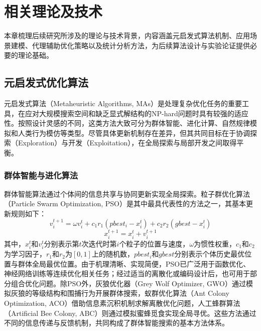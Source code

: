 \chapter{相关理论及技术}

本章梳理后续研究所涉及的理论与技术背景，内容涵盖元启发式算法机制、应用场景建模、代理辅助优化策略以及统计分析方法，为后续算法设计与实验论证提供必要的理论基础。

\section{元启发式优化算法}

元启发式算法（Metaheuristic Algorithms, MAs）是处理复杂优化任务的重要工具，在应对大规模搜索空间和缺乏显式解结构的NP-hard问题时具有较强的适应性\cite{ibsa_ref4,sbo_ref1}。按照设计灵感的不同，这类方法大致可分为群体智能、进化计算、自然规律模拟和人类行为模仿等类型\cite{sbo_ref11}。尽管具体更新机制存在差异，但其共同目标在于协调探索（Exploration）与开发（Exploitation），在全局探索与局部开发之间取得平衡\cite{ibsa_ref75}。

\subsection{群体智能与进化算法}

群体智能算法通过个体间的信息共享与协同更新实现全局探索\cite{sbo_ref18}。粒子群优化算法（Particle Swarm Optimization, PSO）\cite{ibsa_ref26}是其中最具代表性的方法之一，其基本更新规则如下：
\begin{equation}
v_i^{t+1} = \omega v_i^t + c_1 r_1 (pbest_i - x_i^t) + c_2 r_2 (gbest - x_i^t)
\end{equation}
\begin{equation}
x_i^{t+1} = x_i^t + v_i^{t+1}
\end{equation}
其中，$x_i^t$和$v_i^t$分别表示第$t$次迭代时第$i$个粒子的位置与速度，$\omega$为惯性权重，$c_1$和$c_2$为学习因子，$r_1$和$r_2$为$[0,1]$上的随机数，$pbest_i$和$gbest$分别表示个体历史最优位置与群体全局最优位置。由于机理清晰、实现简便，PSO已广泛用于函数优化、神经网络训练等连续优化相关任务；经过适当的离散化或编码设计后，也可用于部分组合优化问题。除PSO外，灰狼优化器（Grey Wolf Optimizer, GWO）\cite{ibsa_ref81}通过模拟灰狼的等级结构和围捕行为开展群体搜索，蚁群优化算法（Ant Colony Optimization, ACO）\cite{ibsa_ref25}借助信息素沉积机制求解离散优化问题，人工蜂群算法（Artificial Bee Colony, ABC）\cite{ibsa_ref27}则通过模拟蜜蜂觅食实现全局寻优。这些方法通过不同的信息传递与反馈机制，共同构成了群体智能搜索的基本方法体系。

